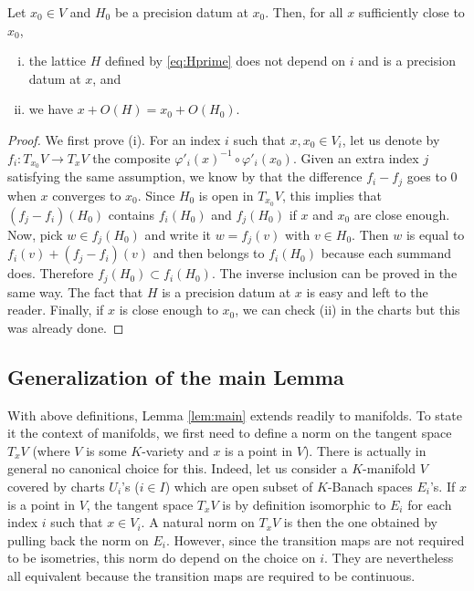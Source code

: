 \documentclass{lms}
\begin{document}
\begin{prop}
Let $x_0 \in V$ and $H_0$ be a precision datum at $x_0$.
Then, for all $x$ sufficiently close to $x_0$,
\begin{enumerate}[(i)]
\item the lattice $H$ defined by \eqref{eq:Hprime} does not depend 
on $i$ and is a precision datum at $x$, and
\item we have $x + O(H) = x_0 + O(H_0)$.
\end{enumerate}
\end{prop}

\begin{proof}
We first prove (i). For an index $i$ such that $x, x_0 \in V_i$, let us 
denote by $f_i : T_{x_0} V \to T_x V$ the composite $\varphi'_i(x)^{-1} 
\circ \varphi'_i(x_0)$. Given an extra index $j$ satisfying the same
assumption, we know by  that the difference
$f_i - f_j$ goes to $0$ when $x$ converges to $x_0$. Since $H_0$ is open
in $T_{x_0} V$, this implies that $(f_j - f_i)(H_0)$ contains $f_i(H_0)$ and 
$f_j(H_0)$ if $x$ and $x_0$ are close enough. Now, pick $w \in f_j(H_0)$ and 
write it $w = f_j(v)$ with $v \in H_0$. Then $w$ is equal to $f_i(v) + 
(f_j - f_i)(v)$ and then belongs to $f_i(H_0)$ because each summand does. 
Therefore $f_j(H_0) \subset f_i(H_0)$. The inverse inclusion can be proved 
in the same way. The fact that $H$ is a precision datum at $x$ is easy
and left to the reader.
Finally, if $x$ is close enough to $x_0$, we can check (ii) in the 
charts but this was already done.
\end{proof}

\subsection{Generalization of the main Lemma}

With above definitions, Lemma \ref{lem:main} extends readily to 
manifolds. To state it the context of manifolds, we first need to define 
a norm on the tangent space $T_x V$ (where $V$ is some $K$-variety and 
$x$ is a point in $V$). There is actually in general no canonical choice 
for this. Indeed, let us consider a $K$-manifold $V$ covered by charts 
$U_i$'s ($i \in I$) which are open subset of $K$-Banach spaces $E_i$'s. If $x$ 
is a point in $V$, the tangent space $T_x V$ is by definition isomorphic 
to $E_i$ for each index $i$ such that $x \in V_i$. A natural norm on 
$T_x V$ is then the one obtained by pulling back the norm on $E_i$. 
However, since the transition maps are not required to be isometries, 
this norm do depend on the choice on $i$. They are nevertheless all
equivalent because the transition maps are required to be continuous.
\end{document}
